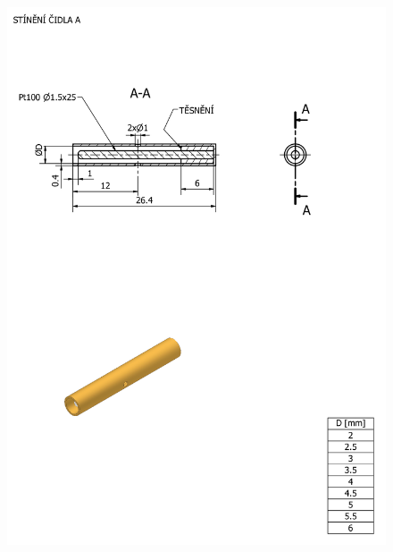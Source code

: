     \begin{figure}[ht!]
        \centering
        \includegraphics[width=\textwidth]{400_SIMULACE_KONSTRUKCNICH_UPRAV/Vykresy_rendery/Prumer_stineni_A_vykres.png}
        
    \end{figure}
    \newpage
{} \label{fig:odvetrani-A-vykres}
